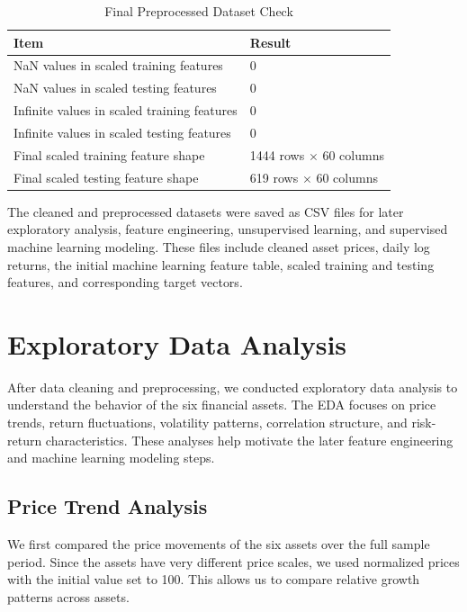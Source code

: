 \documentclass[12pt]{article}
\begin{document}
\begin{table}[H]
\centering
\caption{Final Preprocessed Dataset Check}
\begin{tabular}{ll}
\toprule
\textbf{Item} & \textbf{Result} \\
\midrule
NaN values in scaled training features & 0 \\
NaN values in scaled testing features & 0 \\
Infinite values in scaled training features & 0 \\
Infinite values in scaled testing features & 0 \\
Final scaled training feature shape & 1444 rows $\times$ 60 columns \\
Final scaled testing feature shape & 619 rows $\times$ 60 columns \\
\bottomrule
\end{tabular}
\end{table}

The cleaned and preprocessed datasets were saved as CSV files for later exploratory analysis, feature engineering, unsupervised learning, and supervised machine learning modeling. These files include cleaned asset prices, daily log returns, the initial machine learning feature table, scaled training and testing features, and corresponding target vectors.


\section{Exploratory Data Analysis}

After data cleaning and preprocessing, we conducted exploratory data analysis to understand the behavior of the six financial assets. The EDA focuses on price trends, return fluctuations, volatility patterns, correlation structure, and risk-return characteristics. These analyses help motivate the later feature engineering and machine learning modeling steps.

\subsection{Price Trend Analysis}

We first compared the price movements of the six assets over the full sample period. Since the assets have very different price scales, we used normalized prices with the initial value set to 100. This allows us to compare relative growth patterns across assets.
\end{document}
